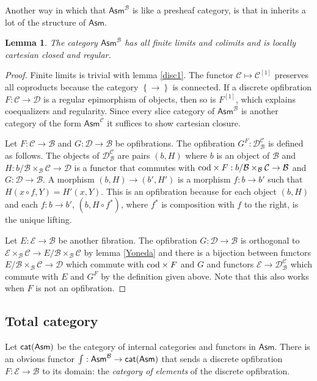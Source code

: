 \documentclass{amsart}
\theoremstyle{plain}
\newtheorem{lemma}[theorem]{Lemma}
\theoremstyle{definition}
\newcommand\cat\mathcal
\newcommand\set[1]{\left\{#1\right\}}
\newcommand\ri{^*}
\newcommand\Asm{\mathsf{Asm}}
\newcommand\sier{{[1]}}
\begin{document}
Another way in which that $\Asm^{\cat B}$ is like a presheaf category, is that in inherits a lot of the structure of $\Asm$.

\begin{lemma} The category $\Asm^{\cat B}$ has all finite limits and colimits and is locally cartesian closed and regular. \end{lemma}

\begin{proof} Finite limits is trivial with lemma \ref{disc1}. The functor $\cat C \mapsto \cat C^\sier$ preserves all coproducts because the category $\set\to$ is connected. If a discrete opfibration $F:\cat C\to\cat D$ is a regular epimorphism of objects, then so is $F^\sier$, which explains coequalizers and regularity. Since every slice category of $\Asm^{\cat B}$ is another category of the form $\Asm^{\cat C}$ it suffices to show cartesian closure. 

Let $F:\cat C\to\cat B$ and $G:\cat D\to\cat B$ be opfibrations. The opfibration $G^F:\cat D^{\cat C}_{\cat B}$ is defined as follows. The objects of $\cat D^{\cat C}_{\cat B}$ are pairs $(b,H)$ where $b$ is an object of $\cat B$ and $H:b/\cat B \times_{\cat B} \cat C\to \cat D$ is a functor that commutes with $\cod\times F:b/\cat B \times_{\cat B} \cat C \to \cat B$ and $G:\cat D \to \cat B$. A morphism $(b,H) \to (b', H')$ is a morphism $f:b\to b'$ such that $H(x\circ f,Y) = H'(x,Y)$. This is an opfibration because for each object $(b,H)$ and each $f:b\to b'$, $(b,H\circ f\ri)$, where $f\ri$ is composition with $f$ to the right, is the unique lifting.

Let $E:\cat E\to\cat B$ be another fibration. The opfibration $G:\cat D\to\cat B$ is orthogonal to $\cat E\times_{\cat B}\cat C \to E/\cat B\times_{\cat B} \cat C$ by lemma \ref{Yoneda} and there is a bijection between functors $E/\cat B\times_{\cat B} \cat C \to\cat D$ which commute with $\mathrm{cod}\times F$ and $G$ and functors $\cat E \to \cat D^{\cat C}_{\cat B}$ which commute with $E$ and $G^F$ by the definition given above. Note that this also works when $F$ is not an opfibration.
\end{proof}

\subsection{Total category}
Let $\mathsf{cat(Asm)}$ be the category of internal categories and functors in $\Asm$. There is an obvious functor $\tot:\Asm^{\cat B} \to \catasm$ that sends a discrete opfibration $F:\cat E\to\cat B$ to its domain: the \emph{category of elements} of the discrete opfibration.
\end{document}

